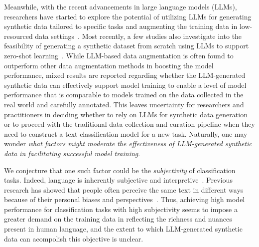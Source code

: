 Meanwhile, with the recent advancements in large language models (LLMs), researchers have started to explore the potential of utilizing LLMs for generating synthetic data tailored to specific tasks and augmenting the training data in low-resourced data settings~\cite{kumar2020data,yoo2021gpt3mix,hartvigsen2022toxigen,sahu2022data}.
Most recently, a few studies also investigate into the feasibility of generating a synthetic dataset from scratch using LLMs to support zero-shot learning~\cite{ye2022zerogen,wang2021towards,tang2023does,gao2023self}. 
While LLM-based data augmentation is often found to outperform other data augmentation methods in boosting the model performance, mixed results are reported regarding whether the LLM-generated synthetic data can effectively support model training to enable a level of model performance that is comparable to models trained on the data collected in the real world and carefully annotated. This leaves uncertainty for researchers and practitioners in deciding whether to rely on LLMs for synthetic data generation or to proceed with the traditional data collection and curation pipeline when they need to construct a text classification model for a new task. Naturally, one may wonder {\em what factors might moderate the effectiveness of LLM-generated synthetic data in facilitating successful model training}. 

We conjecture that one such factor could be the {\em subjectivity} of classification tasks. Indeed, language is inherently subjective and interpretive~\cite{benveniste1971subjectivity,wiebe2004learning}. Previous research has showed that people often perceive the same text in different ways because of their personal biases and perspectives~\cite{sap2021annotators,li2022towards,gordon2022jury}. Thus, achieving high model performance for classification tasks with high subjectivity seems to impose a greater demand on the training data in reflecting the richness and nuances present in human language, and the extent to which LLM-generated synthetic data can acompolish this objective is unclear.   

